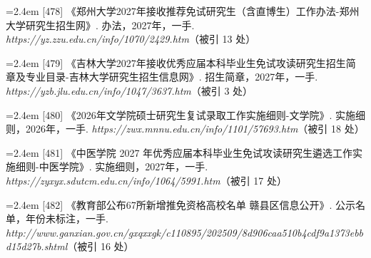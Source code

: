 {\vspace{0.6pt}
\vspace{3.5pt}\par
\nopagebreak\vspace{1pt}
\noindent\hangindent=2.4em \label{src:S0635}{\color{cAccent}[478]} 《郑州大学2027年接收推荐免试研究生（含直博生）工作办法-郑州大学研究生招生网》. 办法，2027年，一手. \textit{https://yz.zzu.edu.cn/info/1070/2429.htm}（被引 13 处）\par
\vspace{0.6pt}
\vspace{3.5pt}\par
\nopagebreak\vspace{1pt}
\noindent\hangindent=2.4em \label{src:S0636}{\color{cAccent}[479]} 《吉林大学2027年接收优秀应届本科毕业生免试攻读研究生招生简章及专业目录-吉林大学研究生招生信息网》. 招生简章，2027年，一手. \textit{https://yzb.jlu.edu.cn/info/1047/3637.htm}（被引 3 处）\par
\vspace{0.6pt}
\vspace{3.5pt}\par
\nopagebreak\vspace{1pt}
\noindent\hangindent=2.4em \label{src:S0638}{\color{cAccent}[480]} 《2026年文学院硕士研究生复试录取工作实施细则-文学院》. 实施细则，2026年，一手. \textit{https://zwx.mnnu.edu.cn/info/1101/57693.htm}（被引 18 处）\par
\vspace{0.6pt}
\vspace{3.5pt}\par
\nopagebreak\vspace{1pt}
\noindent\hangindent=2.4em \label{src:S0639}{\color{cAccent}[481]} 《中医学院 2027 年优秀应届本科毕业生免试攻读研究生遴选工作实施细则-中医学院》. 实施细则，2027年，一手. \textit{https://zyxyx.sdutcm.edu.cn/info/1064/5991.htm}（被引 17 处）\par
\vspace{0.6pt}
\vspace{3.5pt}\par
\nopagebreak\vspace{1pt}
\noindent\hangindent=2.4em \label{src:S0640}{\color{cAccent}[482]} 《教育部公布67所新增推免资格高校名单
\textbar{}
赣县区信息公开》. 公示名单，年份未标注，一手. \textit{http://www.ganxian.gov.cn/gxqxxgk/c110895/202509/8d906caa510b4cdf9a1373ebbd15d27b.shtml}（被引 16 处）\par
}
